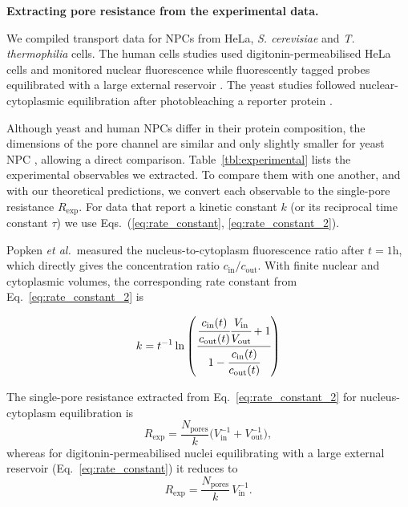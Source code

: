 \documentclass[10pt, a4paper, twocolumn]{article}
\begin{document}
\textbf{Extracting pore resistance from the experimental data.}
    
We compiled transport data for NPCs from HeLa, \textit{S. cerevisiae} and \textit{T. thermophilia} cells.  
The human cells studies used digitonin-permeabilised HeLa cells and monitored nuclear fluorescence while fluorescently tagged probes equilibrated with a large external reservoir 
\cite{Ribbeck2001,Mohr2009,Frey2018}.  
The yeast studies followed nuclear-cytoplasmic equilibration after
photobleaching a reporter protein \cite{Popken2015,Timney2016}.

Although yeast and human NPCs differ in their protein composition, the dimensions of the pore channel are similar and only slightly smaller for yeast NPC \cite{Yang1998}, allowing a direct comparison.  
Table~\ref{tbl:experimental} lists the experimental observables we extracted. 
To compare them with one another, and with our theoretical predictions, we convert each observable to the single-pore resistance $R_{\text{exp}}$.  
For data that report a kinetic constant $k$ (or its reciprocal time constant $\tau$) we use Eqs.~(\ref{eq:rate_constant}, \ref{eq:rate_constant_2}).

Popken \textit{et al.}\,\cite{Popken2015} measured the
nucleus-to-cytoplasm fluorescence ratio after $t =  1\text{h}$, which directly gives the concentration ratio
$c_{\text{in}}/c_{\text{out}}$.  
With finite nuclear and cytoplasmic volumes, the corresponding rate
constant from Eq.~\ref{eq:rate_constant_2} is

\begin{equation}
    k = t^{-1}\ln\left(
        \cfrac{\cfrac{c_{\text{in}}(t)}{c_{\text{out}}(t)} \cfrac{V_{\text{in}}}{V_{\text{out}}} +1}
             {1 - \cfrac{c_{\text{in}}(t)}{c_{\text{out}}(t)}}
        \right)
\end{equation}

The single-pore resistance extracted from Eq.~\ref{eq:rate_constant_2}
for nucleus-cytoplasm equilibration is
\begin{equation*}
  R_{\text{exp}}
  = \frac{N_{\text{pores}}}{k}
    \bigl(V_{\text{in}}^{-1}+V_{\text{out}}^{-1}\bigr),
\end{equation*}
whereas for digitonin-permeabilised nuclei equilibrating with a large
external reservoir (Eq.~\ref{eq:rate_constant}) it reduces to
\begin{equation*}
  R_{\text{exp}}
  = \frac{N_{\text{pores}}}{k}\,V_{\text{in}}^{-1}.
\end{equation*}
\end{document}
